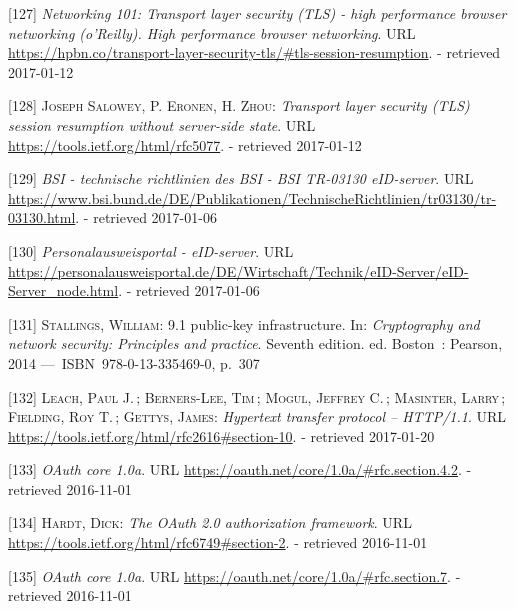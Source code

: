 \documentclass[12pt,english,a4paper,titlepage,cleardoublepage=empty,dottedtoc]{report}
\begin{document}
\hypertarget{ref-book_2013_networking-101_tls-session-resumption}{}
{[}127{]} \emph{Networking 101: Transport layer security (TLS) - high
performance browser networking (o'Reilly). High performance browser
networking}. URL
\url{https://hpbn.co/transport-layer-security-tls/\#tls-session-resumption}.
- retrieved 2017-01-12

\hypertarget{ref-web_spec_tls-session-ticket-resumption}{}
{[}128{]} \textsc{Joseph Salowey, P. Eronen, \textnormal{H. Zhou}}:
\emph{Transport layer security (TLS) session resumption without
server-side state}. URL \url{https://tools.ietf.org/html/rfc5077}. -
retrieved 2017-01-12

\hypertarget{ref-web_bsi-spec_eid}{}
{[}129{]} \emph{BSI - technische richtlinien des BSI - BSI TR-03130
eID-server}. URL
\url{https://www.bsi.bund.de/DE/Publikationen/TechnischeRichtlinien/tr03130/tr-03130.html}.
- retrieved 2017-01-06

\hypertarget{ref-web_2017_npa-eid-server}{}
{[}130{]} \emph{Personalausweisportal - eID-server}. URL
\url{https://personalausweisportal.de/DE/Wirtschaft/Technik/eID-Server/eID-Server_node.html}.
- retrieved 2017-01-06

\hypertarget{ref-book_2014_chapter-10-5-asym-random-number-gen}{}
{[}131{]} \textsc{Stallings, William}: 9.1 public-key infrastructure.
In: \emph{Cryptography and network security: Principles and practice}.
Seventh edition. ed. Boston~: Pearson, 2014 ---~ISBN~978-0-13-335469-0,
p.~307

\hypertarget{ref-web_spec_http-error-codes}{}
{[}132{]} \textsc{Leach, Paul J.}\,; \textsc{Berners-Lee, Tim}\,;
\textsc{Mogul, Jeffrey C.}\,; \textsc{Masinter, Larry}\,;
\textsc{Fielding, Roy T.}\,; \textsc{Gettys, James}: \emph{Hypertext
transfer protocol -- HTTP/1.1}. URL
\url{https://tools.ietf.org/html/rfc2616\#section-10}. - retrieved
2017-01-20

\hypertarget{ref-web_spec_oauth-1a_client-reg}{}
{[}133{]} \emph{OAuth core 1.0a}. URL
\url{https://oauth.net/core/1.0a/\#rfc.section.4.2}. - retrieved
2016-11-01

\hypertarget{ref-web_spec_oauth-2_client-reg}{}
{[}134{]} \textsc{Hardt, Dick}: \emph{The OAuth 2.0 authorization
framework}. URL \url{https://tools.ietf.org/html/rfc6749\#section-2}. -
retrieved 2016-11-01

\hypertarget{ref-web_spec_oauth-1a_access-verification}{}
{[}135{]} \emph{OAuth core 1.0a}. URL
\url{https://oauth.net/core/1.0a/\#rfc.section.7}. - retrieved
2016-11-01
\end{document}
